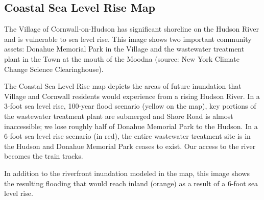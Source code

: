 \subsection*{Coastal Sea Level Rise Map}
The Village of Cornwall-on-Hudson has significant shoreline on the Hudson River 
and is vulnerable to sea level rise. This image shows two important community 
assets: Donahue Memorial Park in the Village and the wastewater treatment plant 
in the Town at the mouth of the Moodna (source: New York Climate Change Science 
Clearinghouse).
\par
The Coastal Sea Level Rise map depicts the areas of future inundation that 
Village and Cornwall residents would experience from a rising Hudson River. In 
a 3-foot sea level rise, 100-year flood scenario (yellow on the map), key 
portions of the wastewater treatment plant are submerged and Shore Road is 
almost inaccessible; we lose roughly half of Donahue Memorial Park to the 
Hudson. In a 6-foot sea level rise scenario (in red), the entire wastewater 
treatment site is in the Hudson and Donahue Memorial Park ceases to exist. Our 
access to the river becomes the train tracks.
\par
In addition to the riverfront inundation modeled in the map, this image shows 
the resulting flooding that would reach inland (orange) as a result of a 6-foot 
sea level rise. 

